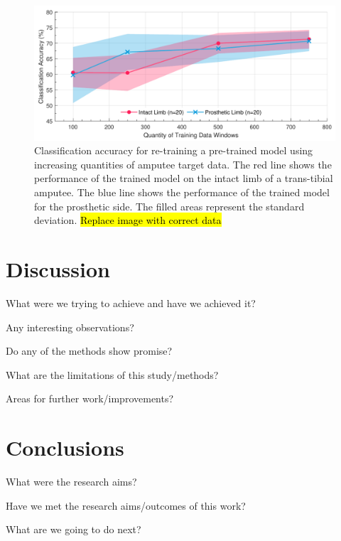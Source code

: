 \begin{figure}[hbt]
    \centering
    \includegraphics[width=\textwidth]{content/6-Amputee/ch6_amputee_pre_trained_model.pdf}
    \caption[Classification accuracy for re-training a pre-trained model using increasing quantities of amputee target data]{Classification accuracy for re-training a pre-trained model using increasing quantities of amputee target data. The red line shows the performance of the trained model on the intact limb of a trans-tibial amputee. The blue line shows the performance of the trained model for the prosthetic side. The filled areas represent the standard deviation. \hl{Replace image with correct data}}
    \label{fig:ch6-amputee-retrain-pre-trained}
\end{figure}


\section{Discussion}
What were we trying to achieve and have we achieved it?

Any interesting observations?

Do any of the methods show promise?


What are the limitations of this study/methods?

Areas for further work/improvements?
\section{Conclusions}
What were the research aims?

Have we met the research aims/outcomes of this work?

What are we going to do next?